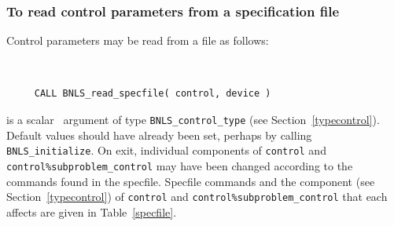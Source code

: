 \documentclass{galahad}
\newcommand{\packagename}{BNLS}
\begin{document}
\subsubsection{To read control parameters from a specification file}
\label{readspec}

Control parameters may be read from a file as follows:
\hskip0.5in
\def\baselinestretch{0.8} {\tt
\begin{verbatim}
     CALL BNLS_read_specfile( control, device )
\end{verbatim}
}
\def\baselinestretch{1.0}

\begin{description}
 is a scalar \intentinout\ argument of type
{\tt \packagename\_control\_type}
(see Section~\ref{typecontrol}).
Default values should have already been set, perhaps by calling
{\tt \packagename\_initialize}.
On exit, individual components of {\tt control} and
{\tt control\%subproblem\_control}
may have been changed
according to the commands found in the specfile. Specfile commands and
the component (see Section~\ref{typecontrol}) of {\tt control}
and {\tt control\%subproblem\_control}
that each affects are given in Table~\ref{specfile}.


\end{description}
\end{document}
